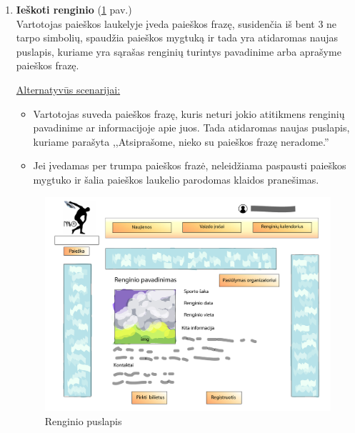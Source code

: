 \documentclass{VUMIFPSkursinis}
\begin{document}
\begin{enumerate} [label = \textbf{U\arabic*.}]
			\item \textbf{Ieškoti renginio} (\ref{fig:uzd_renginiai} pav.)\\
					Vartotojas paieškos laukelyje įveda paieškos frazę, susidenčia iš bent 3 ne tarpo simbolių, spaudžia paieškos mygtuką ir tada yra atidaromas naujas puslapis, kuriame yra sąrašas renginių turintys pavadinime arba aprašyme paieškos frazę.
					
				\underline{Alternatyvūs scenarijai:}
				\begin{itemize}
						\item Vartotojas suveda paieškos frazę, kuris neturi jokio atitikmens renginių pavadinime ar informacijoje apie juos. Tada atidaromas naujas puslapis, kuriame parašyta ,,Atsiprašome, nieko su paieškos frazę neradome.''
						\item Jei įvedamas per trumpa paieškos frazė, neleidžiama paspausti paieškos mygtuko ir šalia paieškos laukelio parodomas klaidos pranešimas.
				\end{itemize}

				\begin{figure}[H]
					\centering
					\includegraphics[width=\textwidth]{img/PSI4/renginioPuslapis-01.jpg}
					\caption{Renginio puslapis}
					\label{fig:uzd_renginiai}
				\end{figure}
				

\end{enumerate}
\end{document}
